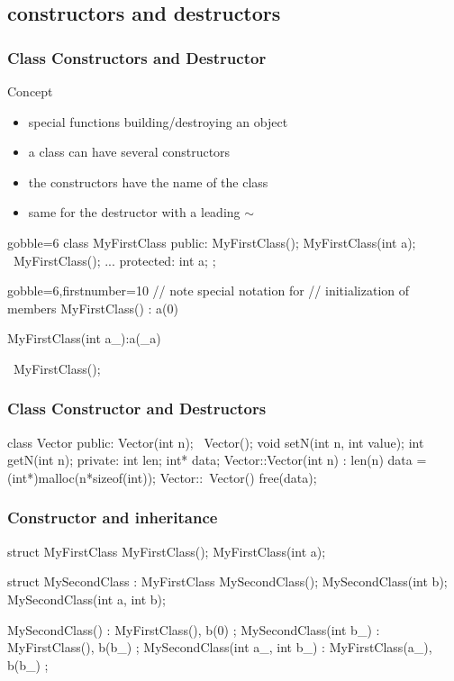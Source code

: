 \subsection{constructors and destructors}


\begin{frame}[fragile]
  \frametitle{Class Constructors and Destructor}
  \begin{block}{Concept}
    \begin{itemize}
    \item special functions building/destroying an object
    \item a class can have several constructors
    \item the constructors have the name of the class
    \item same for the destructor with a leading $\sim$
    \end{itemize}
  \end{block}
  \begin{multicols}{2}
    \begin{cppcode*}{gobble=6}
      class MyFirstClass {
      public:
        MyFirstClass();
        MyFirstClass(int a);
        ~MyFirstClass();
        ...
      protected:
        int a;
      };
    \end{cppcode*}
    \columnbreak
    \begin{cppcode*}{gobble=6,firstnumber=10}
      // note special notation for
      // initialization of members
      MyFirstClass() : a(0) {}
      
      MyFirstClass(int a_):a(_a) {}

      ~MyFirstClass(){};
    \end{cppcode*}
  \end{multicols}
\end{frame}


\begin{frame}[fragile]
  \frametitle{Class Constructor and Destructors}
  \begin{cppcode}
    class Vector {
    public:
      Vector(int n);
      ~Vector();
      void setN(int n, int value);
      int getN(int n);
    private:
      int len;
      int* data;
    }
    Vector::Vector(int n) : len(n) {
      data = (int*)malloc(n*sizeof(int));
    }
    Vector::~Vector() {
      free(data);
    }
  \end{cppcode}
\end{frame}


\begin{frame}[fragile]
  \frametitle{Constructor and inheritance}
  \begin{cppcode}
    struct MyFirstClass {
      MyFirstClass();
      MyFirstClass(int a);
    }

    struct MySecondClass : MyFirstClass {
      MySecondClass();
      MySecondClass(int b);
      MySecondClass(int a, int b);
    }

    MySecondClass() : MyFirstClass(), b(0) {};
    MySecondClass(int b_) : MyFirstClass(), b(b_) {};
    MySecondClass(int a_,
                  int b_) : MyFirstClass(a_), b(b_) {};
  \end{cppcode}
\end{frame}


